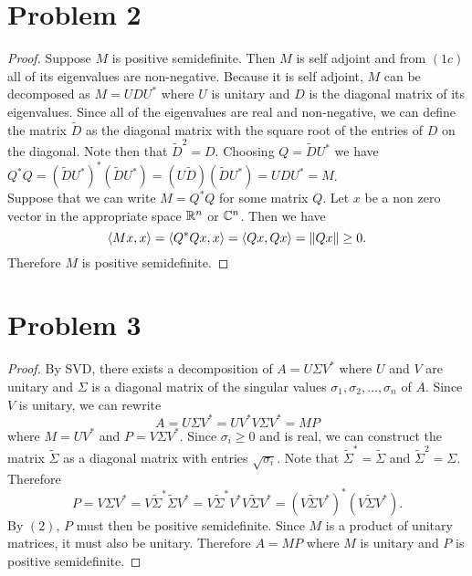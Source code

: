 \documentclass{article}
\begin{document}
\section*{Problem 2}
\begin{proof}
    Suppose $M$ is positive semidefinite. Then $M$ is self adjoint and from $(1c)$ all of its eigenvalues are non-negative. Because it is self adjoint, $M$ can be decomposed as $M = UDU^*$ where $U$ is unitary and $D$ is the diagonal matrix of its eigenvalues. Since all of the eigenvalues are real and non-negative, we can define the matrix $\widetilde{D}$ as the diagonal matrix with the square root of the entries of $D$ on the diagonal. Note then that $\widetilde{D}^2 = D$. Choosing $Q = \widetilde{D} U^*$ we have $Q^* Q = (\widetilde{D} U^*)^* (\widetilde{D} U^*) = (U \widetilde{D}) (\widetilde{D} U^*) = U D U^* = M$. 
    \\

    Suppose that we can write $M = Q^* Q$ for some matrix $Q$. Let $x$ be a non zero vector in the appropriate space $\mathbb{R}^n$ or $\mathbb{C}^n$. Then we have
    \[
        \iprd{Mx, x} = \iprd{Q^* Q x, x} = \iprd{Qx, Qx} = \norm{Qx} \geq 0
    .\]
    Therefore $M$ is positive semidefinite.
\end{proof}

\section*{Problem 3}
\begin{proof}
    By SVD, there exists a decomposition of $A = U \Sigma V^*$ where $U$ and $V$ are unitary and $\Sigma$ is a diagonal matrix of the singular values $\sigma_1, \sigma_2, \ldots, \sigma_n$ of $A$. Since $V$ is unitary, we can rewrite
    \[
        A = U \Sigma V^* = U V^* V \Sigma V^* = M P
    \]
    where $M = UV^*$ and $P = V \Sigma V^*$. Since $\sigma_i \geq 0$ and is real, we can construct the matrix $\widetilde{\Sigma}$ as a diagonal matrix with entries $\sqrt{\sigma_i}$. Note that $\widetilde{\Sigma}^* = \widetilde{\Sigma}$ and $\widetilde{\Sigma}^2 = \Sigma$. Therefore
    \[
        P = V \Sigma V^* = V \widetilde{\Sigma}^* \widetilde{\Sigma} V^* = V \widetilde{\Sigma}^* V^* V \widetilde{\Sigma} V^* = (V \widetilde{\Sigma} V^*)^* (V \widetilde{\Sigma} V^*)
    .\]
    By $(2)$, $P$ must then be positive semidefinite. Since $M$ is a product of unitary matrices, it must also be unitary. Therefore $A = MP$ where $M$ is unitary and $P$ is positive semidefinite.
\end{proof}
\end{document}
